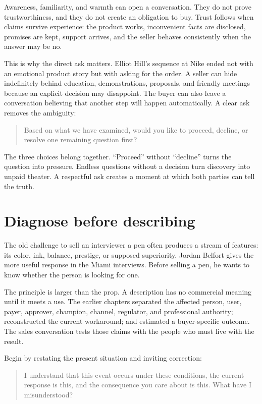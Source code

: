 Awareness, familiarity, and warmth can open a conversation. They do not prove
trustworthiness, and they do not create an obligation to buy. Trust follows
when claims survive experience: the product works, inconvenient facts are
disclosed, promises are kept, support arrives, and the seller behaves
consistently when the answer may be no.

This is why the direct ask matters. Elliot Hill's sequence at Nike ended not
with an emotional product story but with asking for the order. A seller can
hide indefinitely behind education, demonstrations, proposals, and friendly
meetings because an explicit decision may disappoint. The buyer can also leave
a conversation believing that another step will happen automatically. A clear
ask removes the ambiguity:

\begin{quote}
Based on what we have examined, would you like to proceed, decline, or resolve
one remaining question first?
\end{quote}

The three choices belong together. ``Proceed'' without ``decline'' turns the
question into pressure. Endless questions without a decision turn discovery
into unpaid theater. A respectful ask creates a moment at which both parties
can tell the truth.

\section{Diagnose before describing}

The old challenge to sell an interviewer a pen often produces a stream of
features: its color, ink, balance, prestige, or supposed superiority. Jordan
Belfort gives the more useful response in the Miami interviews. Before selling
a pen, he wants to know whether the person is looking for one.

The principle is larger than the prop. A description has no commercial meaning
until it meets a use. The earlier chapters separated the affected person, user,
payer, approver, champion, channel, regulator, and professional authority;
reconstructed the current workaround; and estimated a buyer-specific outcome.
The sales conversation tests those claims with the people who must live with
the result.

Begin by restating the present situation and inviting correction:

\begin{quote}
I understand that this event occurs under these conditions, the current
response is this, and the consequence you care about is this. What have I
misunderstood?
\end{quote}

